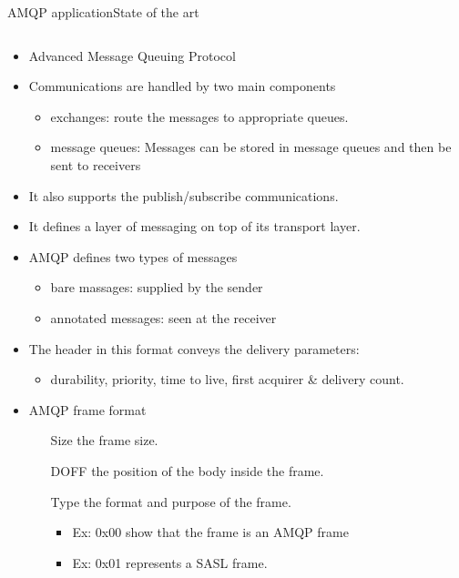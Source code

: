\begin{frame}{AMQP application}{State of the art}
	\begin{columns}
		
		\begin{column}{0.6\textwidth}
		
			\begin{itemize}
				\item Advanced Message Queuing Protocol
				\item Communications are handled by two main components
					\begin{itemize}
						\item exchanges: route the messages to appropriate queues.
						\item message queues: Messages can be stored in message queues and then be sent to receivers
					\end{itemize}
				\item It also supports the publish/subscribe communications.
				\item It defines a layer of messaging on top of its transport layer.
				\item AMQP defines two types of messages
					\begin{itemize}
						\item bare massages: supplied by the sender
						\item annotated messages: seen at the receiver
					\end{itemize}
				\item The header in this format conveys the delivery parameters:
					\begin{itemize}
						\item durability, priority, time to live, first acquirer \& delivery count.
					\end{itemize}
				\item AMQP frame format
					\begin{itemize}
						\item[Size] the frame size.
						\item[DOFF] the position of the body inside the frame.
						\item[Type] the format and purpose of the frame.
							\begin{itemize}
								\item Ex: 0x00 show that the frame is an AMQP frame
								\item Ex: 0x01 represents a SASL frame.
							\end{itemize}
					\end{itemize}
			\end{itemize}
			

\end{column}
\end{columns}
\end{frame}
